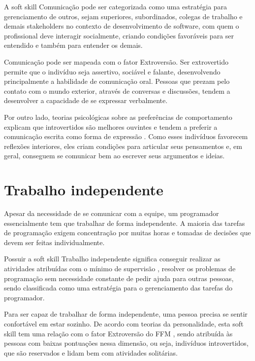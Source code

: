 A soft skill Comunicação pode ser categorizada como uma estratégia para gerenciamento de outros, sejam superiores, subordinados, colegas de trabalho e demais stakeholders no contexto de desenvolvimento de software, com quem o profissional deve interagir socialmente, criando condições favoráveis para ser entendido e também para entender os demais.

Comunicação pode ser mapeada com o fator Extroversão. Ser extrovertido permite que o indivíduo seja assertivo, sociável e falante, desenvolvendo principalmente a habilidade de comunicação oral. Pessoas que prezam pelo contato com o mundo exterior, através de conversas e discussões, tendem a desenvolver a capacidade de se expressar verbalmente.

Por outro lado, teorias psicológicas sobre as preferências de comportamento explicam que introvertidos são melhores ouvintes e tendem a preferir a comunicação escrita como forma de expressão \cite{myers:98}. Como esses indivíduos favorecem reflexões interiores, eles criam condições para articular seus pensamentos e, em geral, conseguem se comunicar bem ao escrever seus argumentos e ideias.

\section{Trabalho independente}

Apesar da necessidade de se comunicar com a equipe, um programador essencialmente tem que trabalhar de forma independente. A maioria das tarefas de programação exigem concentração por muitas horas e tomadas de decisões que devem ser feitas individualmente.

Possuir a soft skill Trabalho independente significa conseguir realizar as atividades atribuídas com o mínimo de supervisão \cite{ahmed:12}, resolver os problemas de programação sem necessidade constante de pedir ajuda para outras pessoas, sendo classificada como uma estratégia para o gerenciamento das tarefas do programador.

Para ser capaz de trabalhar de forma independente, uma pessoa precisa se sentir confortável em estar sozinho. De acordo com teorias da personalidade, esta soft skill tem uma relação com o fator Extroversão do FFM \cite{rehman:12}, sendo atribuída às pessoas com baixas pontuações nessa dimensão, ou seja, indivíduos introvertidos, que são reservados e lidam bem com atividades solitárias.


